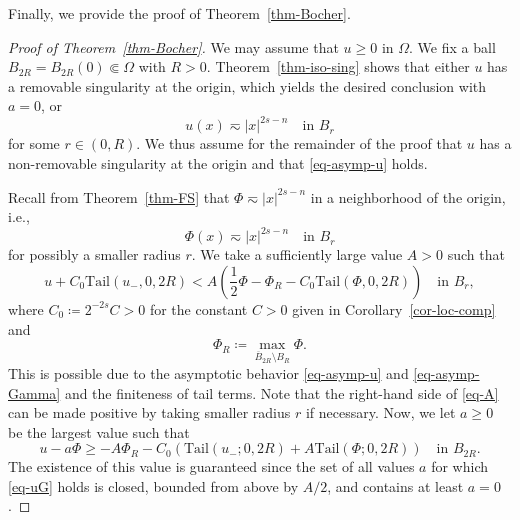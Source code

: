 \documentclass[11pt]{amsart}
\theoremstyle{plain}
\theoremstyle{definition}
\numberwithin{equation}{section}
\begin{document}
Finally, we provide the proof of Theorem~\ref{thm-Bocher}.

\begin{proof}[Proof of Theorem~\ref{thm-Bocher}]
We may assume that $u \geq 0$ in $\Omega$. We fix a ball $B_{2R} = B_{2R}(0) \Subset \Omega$ with $R>0$. Theorem~\ref{thm-iso-sing} shows that either $u$ has a removable singularity at the origin, which yields the desired conclusion with $a=0$, or
\begin{equation}\label{eq-asymp-u}
    u(x) \eqsim |x|^{2s-n} \quad\text{in }B_{r}
\end{equation}
for some $r \in (0,R)$. We thus assume for the remainder of the proof that $u$ has a non-removable singularity at the origin and that \eqref{eq-asymp-u} holds.

Recall from Theorem~\ref{thm-FS} that $\Phi \eqsim |x|^{2s-n}$ in a neighborhood of the origin, i.e.,
\begin{equation}\label{eq-asymp-Gamma}
    \Phi(x) \eqsim |x|^{2s-n} \quad\text{in }B_{r}
\end{equation}
for possibly a smaller radius $r$. We take a sufficiently large value $A>0$ such that
\begin{equation}\label{eq-A}
    u+C_0 \mathrm{Tail}(u_-, 0, 2R) < A \left( \frac{1}{2} \Phi - \Phi_R - C_0 \mathrm{Tail}(\Phi, 0, 2R) \right) \quad\text{in }B_{r},
\end{equation}
where $C_0 \coloneqq 2^{-2s}C>0$ for the constant $C>0$ given in Corollary~\ref{cor-loc-comp} and
\begin{equation*}
    \Phi_R \coloneqq \max_{\overline{B}_{2R} \setminus B_R} \Phi.
\end{equation*}
This is possible due to the asymptotic behavior \eqref{eq-asymp-u} and \eqref{eq-asymp-Gamma} and the finiteness of tail terms. Note that the right-hand side of \eqref{eq-A} can be made positive by taking smaller radius $r$ if necessary. Now, we let $a \geq 0$ be the largest value such that 
    \begin{equation}\label{eq-uG}
        u-a\Phi \geq -A \Phi_R -C_0 (\mathrm{Tail}(u_-; 0, 2R) + A\mathrm{Tail}(\Phi; 0, 2R)) \quad \text{in $B_{2R}$}.
    \end{equation}
    The existence of this value is guaranteed since the set of all values $a$ for which \eqref{eq-uG} holds is closed, bounded from above by $A/2$, and contains at least $a=0$.
    

\end{proof}
\end{document}

